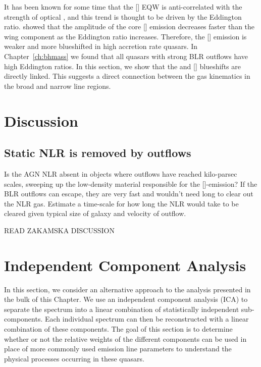 It has been known for some time that the [] EQW is anti-correlated with the strength of optical , and this trend is thought to be driven by the Eddington ratio. 
\citet{shen14} showed that the amplitude of the core [] emission decreases faster than the wing component as the Eddington ratio increases. 
Therefore, the [] emission is weaker and more blueshifted in high accretion rate quasars.  
In Chapter~\ref{ch:bhmass} we found that all quasars with strong BLR outflows have high Eddington ratios. 
In this section, we show that the  and [] blueshifts are directly linked. 
This suggests a direct connection between the gas kinematics in the broad and narrow line regions. 


\section{Discussion}

\subsection{Static NLR is removed by outflows}

Is the AGN NLR absent in objects where outflows have reached kilo-parsec scales, sweeping up the low-density material responsible for the []-emission?
If the BLR outflows can escape, they are very fast and wouldn't need long to clear out the NLR gas. 
Estimate a time-scale for how long the NLR would take to be cleared given typical size of galaxy and velocity of outflow. 

READ ZAKAMSKA DISCUSSION

\section{Independent Component Analysis}

In this section, we consider an alternative approach to the analysis presented in the bulk of this Chapter. 
We use an independent component analysis (ICA) to separate the spectrum into a linear combination of statistically independent sub-components. 
Each individual spectrum can then be reconstructed with a linear combination of these components. 
The goal of this section is to determine whether or not the relative weights of the different components can be used in place of more commonly used emission line parameters to understand the physical processes occurring in these quasars. 

